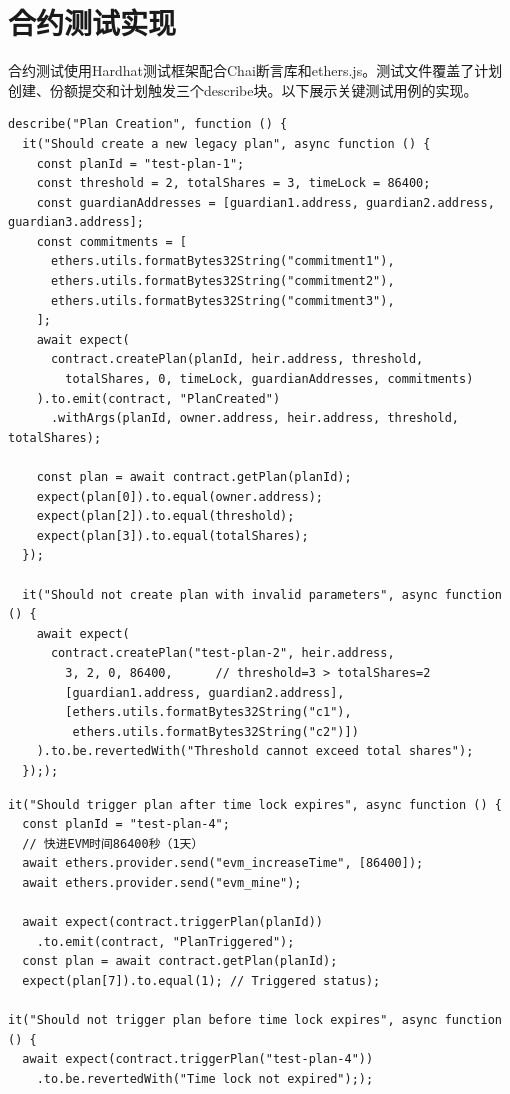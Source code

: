 \documentclass[UTF8,a4paper,zihao=-4,openany]{ctexrep}
\begin{document}
\section{合约测试实现}

合约测试使用Hardhat测试框架配合Chai断言库和ethers.js。测试文件覆盖了计划创建、份额提交和计划触发三个describe块。以下展示关键测试用例的实现。

\begin{lstlisting}[caption={合约计划创建测试 (LegacyContract.test.js:25-84, 节选)}]
describe("Plan Creation", function () {
  it("Should create a new legacy plan", async function () {
    const planId = "test-plan-1";
    const threshold = 2, totalShares = 3, timeLock = 86400;
    const guardianAddresses = [guardian1.address, guardian2.address, guardian3.address];
    const commitments = [
      ethers.utils.formatBytes32String("commitment1"),
      ethers.utils.formatBytes32String("commitment2"),
      ethers.utils.formatBytes32String("commitment3"),
    ];
    await expect(
      contract.createPlan(planId, heir.address, threshold,
        totalShares, 0, timeLock, guardianAddresses, commitments)
    ).to.emit(contract, "PlanCreated")
      .withArgs(planId, owner.address, heir.address, threshold, totalShares);

    const plan = await contract.getPlan(planId);
    expect(plan[0]).to.equal(owner.address);
    expect(plan[2]).to.equal(threshold);
    expect(plan[3]).to.equal(totalShares);
  });

  it("Should not create plan with invalid parameters", async function () {
    await expect(
      contract.createPlan("test-plan-2", heir.address,
        3, 2, 0, 86400,      // threshold=3 > totalShares=2
        [guardian1.address, guardian2.address],
        [ethers.utils.formatBytes32String("c1"),
         ethers.utils.formatBytes32String("c2")])
    ).to.be.revertedWith("Threshold cannot exceed total shares");
  }););
\end{lstlisting}

\begin{lstlisting}[caption={合约时间锁触发测试 (LegacyContract.test.js:160-180, 节选)}]
it("Should trigger plan after time lock expires", async function () {
  const planId = "test-plan-4";
  // 快进EVM时间86400秒（1天）
  await ethers.provider.send("evm_increaseTime", [86400]);
  await ethers.provider.send("evm_mine");

  await expect(contract.triggerPlan(planId))
    .to.emit(contract, "PlanTriggered");
  const plan = await contract.getPlan(planId);
  expect(plan[7]).to.equal(1); // Triggered status);

it("Should not trigger plan before time lock expires", async function () {
  await expect(contract.triggerPlan("test-plan-4"))
    .to.be.revertedWith("Time lock not expired"););
\end{lstlisting}
\end{document}
